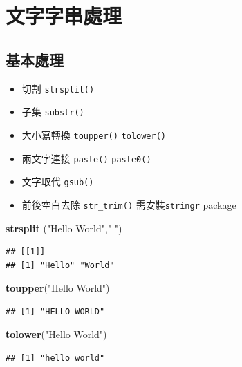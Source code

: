 \documentclass[]{book}
\newenvironment{Shaded}{\begin{snugshade}}{\end{snugshade}}
\newcommand{\KeywordTok}[1]{\textcolor[rgb]{0.13,0.29,0.53}{\textbf{{#1}}}}
\newcommand{\StringTok}[1]{\textcolor[rgb]{0.31,0.60,0.02}{{#1}}}
\newcommand{\NormalTok}[1]{{#1}}
\providecommand{\tightlist}{%
  \setlength{\itemsep}{0pt}\setlength{\parskip}{0pt}}
\theoremstyle{definition}
\theoremstyle{definition}
\theoremstyle{remark}
\begin{document}
\section{文字字串處理}

\subsection{基本處理}

\begin{itemize}
\tightlist
\item
  切割 \texttt{strsplit()}
\item
  子集 \texttt{substr()}
\item
  大小寫轉換 \texttt{toupper()} \texttt{tolower()}
\item
  兩文字連接 \texttt{paste()} \texttt{paste0()}
\item
  文字取代 \texttt{gsub()}
\item
  前後空白去除 \texttt{str\_trim()}
  需安裝\texttt{stringr}\citep{R-stringr} package
\end{itemize}

\begin{Shaded}
\begin{Highlighting}[]
\KeywordTok{strsplit} \NormalTok{(}\StringTok{"Hello World"}\NormalTok{,}\StringTok{" "}\NormalTok{)}
\end{Highlighting}
\end{Shaded}

\begin{verbatim}
## [[1]]
## [1] "Hello" "World"
\end{verbatim}

\begin{Shaded}
\begin{Highlighting}[]
\KeywordTok{toupper}\NormalTok{(}\StringTok{"Hello World"}\NormalTok{)}
\end{Highlighting}
\end{Shaded}

\begin{verbatim}
## [1] "HELLO WORLD"
\end{verbatim}

\begin{Shaded}
\begin{Highlighting}[]
\KeywordTok{tolower}\NormalTok{(}\StringTok{"Hello World"}\NormalTok{)}
\end{Highlighting}
\end{Shaded}

\begin{verbatim}
## [1] "hello world"
\end{verbatim}
\end{document}
